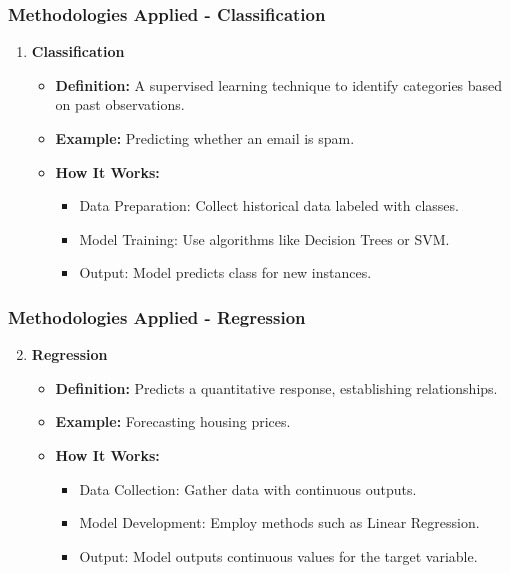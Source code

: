 \documentclass[aspectratio=169]{beamer}
\begin{document}
\begin{frame}
    \frametitle{Methodologies Applied - Classification}
    \begin{enumerate}
        \item \textbf{Classification}
        \begin{itemize}
            \item \textbf{Definition:} A supervised learning technique to identify categories based on past observations.
            \item \textbf{Example:} Predicting whether an email is spam.
            \item \textbf{How It Works:}
            \begin{itemize}
                \item Data Preparation: Collect historical data labeled with classes.
                \item Model Training: Use algorithms like Decision Trees or SVM.
                \item Output: Model predicts class for new instances.
            \end{itemize}
        \end{itemize}
    \end{enumerate}
\end{frame}

\begin{frame}
    \frametitle{Methodologies Applied - Regression}
    \begin{enumerate}
        \setcounter{enumi}{1}  %
        \item \textbf{Regression}
        \begin{itemize}
            \item \textbf{Definition:} Predicts a quantitative response, establishing relationships.
            \item \textbf{Example:} Forecasting housing prices.
            \item \textbf{How It Works:}
            \begin{itemize}
                \item Data Collection: Gather data with continuous outputs.
                \item Model Development: Employ methods such as Linear Regression.
                \item Output: Model outputs continuous values for the target variable.
            \end{itemize}
        \end{itemize}
    \end{enumerate}
\end{frame}
\end{document}
